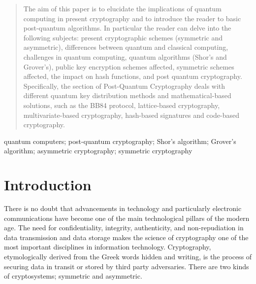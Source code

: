 \documentclass[conference, letterpaper]{IEEEtran}
\begin{document}
\begin{abstract}
The aim of this paper is to elucidate the implications of quantum computing in present cryptography and to introduce the reader to basic post-quantum algorithms.
In particular the reader can delve into the following subjects: present cryptographic schemes (symmetric and asymmetric), differences between quantum and classical computing, challenges in quantum computing, quantum algorithms (Shor's and Grover's), public key encryption schemes affected, symmetric schemes affected, the impact on hash functions, and post quantum cryptography. Specifically, the section of Post-Quantum Cryptography deals with different quantum key distribution methods and mathematical-based solutions, such as the BB84 protocol, lattice-based cryptography, multivariate-based cryptography, hash-based signatures and code-based cryptography.
\end{abstract}



\begin{IEEEkeywords}
quantum computers; post-quantum cryptography; Shor's algorithm; Grover's algorithm; asymmetric cryptography; symmetric cryptography
\end{IEEEkeywords}

\section{Introduction}
\label{sec:introduction}
There is no doubt that advancements in technology and particularly electronic communications have become one of the main technological pillars of the modern age. The need for confidentiality, integrity, authenticity, and non-repudiation in data transmission and data storage makes the science of cryptography one of the most important disciplines in information technology. Cryptography, etymologically derived from the Greek words hidden and writing, is the process of securing data in transit or stored by third party adversaries. There are two kinds of cryptosystems; symmetric and asymmetric. 
\end{document}

